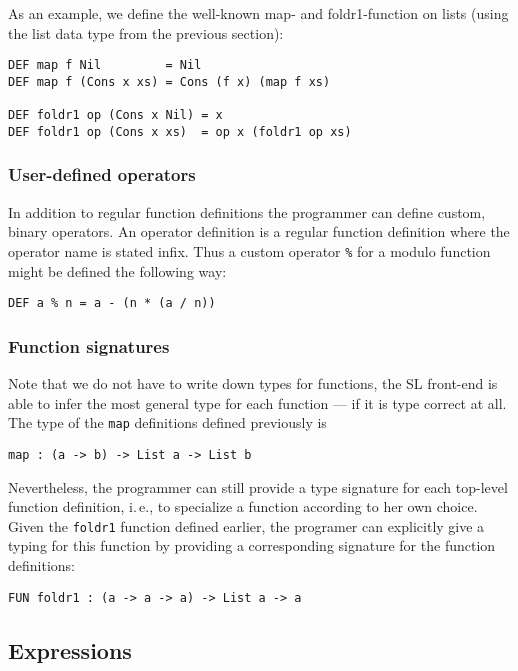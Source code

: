\documentclass{article}
\begin{document}
As an example, we define the well-known map- and foldr1-function on
lists (using the list data type from the previous section):
\begin{verbatim}
DEF map f Nil         = Nil
DEF map f (Cons x xs) = Cons (f x) (map f xs)

DEF foldr1 op (Cons x Nil) = x
DEF foldr1 op (Cons x xs)  = op x (foldr1 op xs)
\end{verbatim}


\subsubsection{User-defined operators}
\label{sec:user-defined-ops}

In addition to regular function definitions the programmer can define
custom, binary operators. An operator definition is a regular function
definition where the operator name is stated infix. Thus a custom
operator \verb|%| for a modulo function might be defined the following
way:
\begin{verbatim}
DEF a % n = a - (n * (a / n))
\end{verbatim}


\subsubsection{Function signatures}
\label{sec:function-signatures}

Note that we do not have to write down types for functions, the SL
front-end is able to infer the most general type for each function ---
if it is type correct at all. The type of the \verb|map| definitions
defined previously is
\begin{verbatim}
map : (a -> b) -> List a -> List b
\end{verbatim}

Nevertheless, the programmer can still provide a type signature for
each top-level function definition, i.\,e., to specialize a function
according to her own choice. Given the \verb|foldr1| function defined
earlier, the programer can explicitly give a typing for this function
by providing a corresponding signature for the function definitions:
\begin{verbatim}
FUN foldr1 : (a -> a -> a) -> List a -> a
\end{verbatim}


\subsection{Expressions}
\label{sec:expressions}
\end{document}
